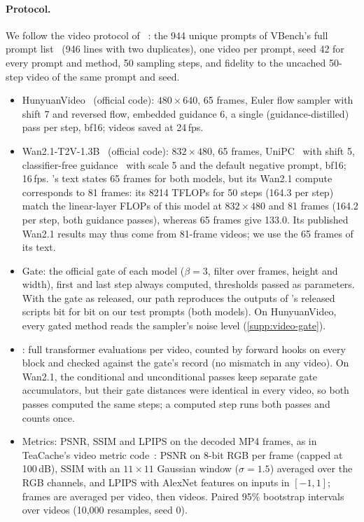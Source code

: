 \paragraph{Protocol.}
We follow the video protocol of \seacache~\cite{chung2026seacache}: the 944 unique prompts of VBench's full prompt
list~\cite{huang2024vbench} (946 lines with two duplicates), one video per prompt, seed 42 for every prompt and method,
50 sampling steps, and fidelity to the uncached 50-step video of the same prompt and seed.
\begin{itemize}[leftmargin=*,itemsep=1pt,topsep=2pt]
  \item HunyuanVideo~\cite{kong2024hunyuanvideo} (official code): $480{\times}640$, 65 frames, Euler flow sampler with
  shift 7 and reversed flow, embedded guidance 6, a single (guidance-distilled) pass per step, bf16; videos saved at
  24\,fps.
  \item Wan2.1-T2V-1.3B~\cite{wan2025wan} (official code): $832{\times}480$, 65 frames, UniPC~\cite{zhao2023unipc} with
  shift 5, classifier-free guidance~\cite{ho2022cfg} with scale 5 and the default negative prompt, bf16; 16\,fps.
  \seacache's text states 65 frames for both models, but its Wan2.1 compute corresponds to 81 frames: its 8214 TFLOPs
  for 50 steps (164.3 per step) match the linear-layer FLOPs of this model at $832{\times}480$ and 81 frames (164.2 per
  step, both guidance passes), whereas 65 frames give 133.0. Its published Wan2.1 results may thus come from 81-frame
  videos; we use the 65 frames of its text.
  \item Gate: the official \sea gate of each model ($\beta=3$, filter over frames, height and width), first and last
  step always computed, thresholds passed as parameters. With the gate as released, our \seacache path reproduces the
  outputs of \seacache's released scripts bit for bit on our test prompts (both models). On HunyuanVideo, every gated
  method reads the sampler's noise level (\cref{supp:video-gate}).
  \item \nfe: full transformer evaluations per video, counted by forward hooks on every block and checked against the
  gate's record (no mismatch in any video). On Wan2.1, the conditional and unconditional passes keep separate gate
  accumulators, but their gate distances were identical in every video, so both passes computed the same steps; a
  computed step runs both passes and counts once.
  \item Metrics: PSNR, SSIM and LPIPS on the decoded MP4 frames, as in TeaCache's video metric
  code~\cite{liu2025teacache}: PSNR on 8-bit RGB per frame (capped at 100\,dB), SSIM with an $11{\times}11$ Gaussian
  window ($\sigma=1.5$) averaged over the RGB channels, and LPIPS with AlexNet features on inputs in $[-1,1]$; frames
  are averaged per video, then videos. Paired 95\% bootstrap intervals over videos (10{,}000 resamples, seed 0).
\end{itemize}

